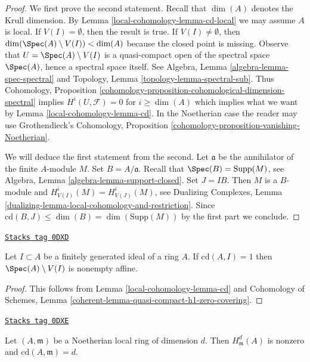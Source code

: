 \begin{proof}
We first prove the second statement.
Recall that $\dim(A)$ denotes the Krull dimension. By
Lemma \ref{local-cohomology-lemma-cd-local} we may assume $A$ is local.
If $V(I) = \emptyset$, then the result is true.
If $V(I) \not = \emptyset$, then
$\dim(\Spec(A) \setminus V(I)) < \dim(A)$ because
the closed point is missing. Observe that
$U = \Spec(A) \setminus V(I)$ is a quasi-compact
open of the spectral space $\Spec(A)$, hence a spectral space itself.
See Algebra, Lemma \ref{algebra-lemma-spec-spectral} and
Topology, Lemma \ref{topology-lemma-spectral-sub}.
Thus Cohomology, Proposition
\ref{cohomology-proposition-cohomological-dimension-spectral}
implies $H^i(U, \mathcal{F}) = 0$ for $i \geq \dim(A)$
which implies what we want by Lemma \ref{local-cohomology-lemma-cd}.
In the Noetherian case the reader may use
Grothendieck's Cohomology, Proposition
\ref{cohomology-proposition-vanishing-Noetherian}.

\medskip\noindent
We will deduce the first statement from the second.
Let $\mathfrak a$ be the annihilator of the finite $A$-module $M$.
Set $B = A/\mathfrak a$. Recall that $\Spec(B) = \text{Supp}(M)$, see
Algebra, Lemma \ref{algebra-lemma-support-closed}.
Set $J = IB$. Then $M$ is a $B$-module
and $H^i_{V(I)}(M) = H^i_{V(J)}(M)$, see
Dualizing Complexes, Lemma
\ref{dualizing-lemma-local-cohomology-and-restriction}.
Since $\text{cd}(B, J) \leq \dim(B) = \dim(\text{Supp}(M))$
by the first part we conclude.
\end{proof}

\begin{lemma}[Cd is one]
\label{local-cohomology-lemma-cd-is-one}
\href{https://stacks.math.columbia.edu/tag/0DXD}{\texttt{Stacks tag 0DXD}}

Let $I \subset A$ be a finitely generated ideal of a ring $A$. If
$\text{cd}(A, I) = 1$ then $\Spec(A) \setminus V(I)$ is nonempty affine.
\end{lemma}

\begin{proof}
This follows from Lemma \ref{local-cohomology-lemma-cd} and
Cohomology of Schemes, Lemma
\ref{coherent-lemma-quasi-compact-h1-zero-covering}.
\end{proof}

\begin{lemma}[Cd maximal]
\label{local-cohomology-lemma-cd-maximal}
\href{https://stacks.math.columbia.edu/tag/0DXE}{\texttt{Stacks tag 0DXE}}

Let $(A, \mathfrak m)$ be a Noetherian local ring of dimension $d$.
Then $H^d_\mathfrak m(A)$ is nonzero and $\text{cd}(A, \mathfrak m) = d$.
\end{lemma}

